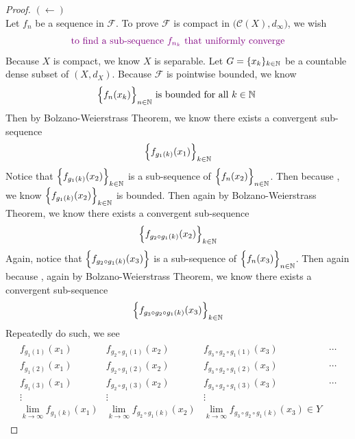 \documentclass{report}
\begin{document}
\begin{proof}
$(\longleftarrow)$\\

Let $f_n$ be a sequence in $\mathcal{F}$. To prove $\mathcal{F}$ is compact in $\big(\mathcal{C}(X),d_{\infty} \big)$, we wish 
\begin{align*}
\textcolor{violet}{\text{ to find a sub-sequence }f_{n_k}\text{ that uniformly converge }}
\end{align*}
Because $X$ is compact, we know $X$ is separable. Let $G=\{ x_k \}_{k\in\mathbb{N}}$ be a countable dense subset of $(X,d_X)$. Because $\mathcal{F}$ is pointwise bounded, we know 
 \begin{align}
\label{A1}
\Big\{ f_n(x_k) \Big\}_{n\in\mathbb{N}}\text{ is bounded for all $k \in\mathbb{N}$ }
\end{align}
Then by Bolzano-Weierstrass Theorem, we know there exists a convergent sub-sequence 
\begin{align*}
\Big\{ f_{g_1(k)}(x_1) \Big\}_{k\in\mathbb{N}} 
\end{align*}
Notice that $\Big\{ f_{g_1(k)}(x_2) \Big\}_{k\in\mathbb{N}}$ is a sub-sequence of $\Big\{ f_n(x_2) \Big\}_{n\in\mathbb{N}}$. Then because , we know $\Big\{ f_{g_1(k)}(x_2) \Big\}_{k\in\mathbb{N}}$ is bounded. Then again by Bolzano-Weierstrass Theorem, we know there exists a convergent sub-sequence 
\begin{align*}
\Big\{ f_{g_2\circ g_1(k)}(x_2) \Big\}_{k\in\mathbb{N}}
\end{align*}
Again, notice that $\Big\{ f_{g_2\circ g_1(k)}(x_3) \Big\}$ is a sub-sequence of $\Big\{ f_n(x_3) \Big\}_{n\in\mathbb{N}}$. Then again because , again by Bolzano-Weierstrass Theorem, we know there exists a convergent sub-sequence 
\begin{align*}
\Big\{ f_{g_3\circ g_2\circ g_1(k)}(x_3) \Big\}_{k\in\mathbb{N}}
\end{align*}
Repeatedly do such, we see 
\begin{align*}
\begin{matrix} 
  f_{g_1(1)}(x_1) & f_{g_2\circ g_1 (1)}(x_2) & f_{g_3\circ g_2 \circ  g_1 (1)}(x_3) & \cdots \\
  f_{g_1(2)}(x_1) & f_{g_2\circ g_1 (2)}(x_2) & f_{g_3\circ g_2 \circ  g_1 (2)}(x_3) & \cdots \\
  f_{g_1(3)}(x_1) & f_{g_2\circ g_1 (3)}(x_2) & f_{g_3\circ g_2 \circ  g_1 (3)}(x_3) & \cdots \\
  \vdots &\vdots &\vdots & \\
  \lim_{k\to \infty } f_{g_1(k)}(x_1) &\lim_{k\to \infty } f_{g_2\circ g_1(k)}(x_2) &\lim_{k\to \infty } f_{g_3\circ g_2\circ g_1(k)}(x_3) \in Y

\end{matrix}
\end{align*}
\end{proof}
\end{document}
